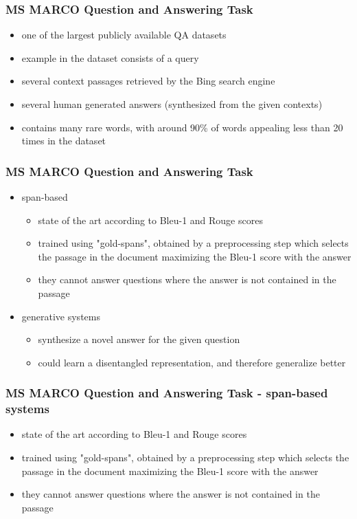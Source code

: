 \documentclass{beamer}
\begin{document}
\begin{frame}
    \frametitle{MS MARCO Question and Answering Task}
    \begin{itemize}
        \item one of the largest publicly available QA datasets
        \item example in the dataset consists of a query
        \item several context passages retrieved by the Bing search engine
        \item several human generated answers (synthesized from the given contexts)
        \item contains many rare words, with around 90\% of words appealing less than 20 times in the dataset
    \end{itemize}
\end{frame}

\begin{frame}
    \frametitle{MS MARCO Question and Answering Task}
    \begin{itemize}
        \item span-based
        \begin{itemize}
            \item state of the art according to Bleu-1 and Rouge scores
            \item trained using "gold-spans", obtained by a preprocessing step which selects the passage in the document maximizing the Bleu-1 score with the answer
            \item they cannot answer questions where the answer is not contained in the passage
        \end{itemize}
        \item generative systems
        \begin{itemize}
            \item synthesize a novel answer for the given question
            \item could learn a disentangled representation, and therefore generalize better
        \end{itemize}
    \end{itemize}
\end{frame}

\begin{frame}
    \frametitle{MS MARCO Question and Answering Task - span-based systems}
    \begin{itemize}
        \item state of the art according to Bleu-1 and Rouge scores
        \item trained using "gold-spans", obtained by a preprocessing step which selects the passage in the document maximizing the Bleu-1 score with the answer
        \item they cannot answer questions where the answer is not contained in the passage
    \end{itemize}
\end{frame}
\end{document}
